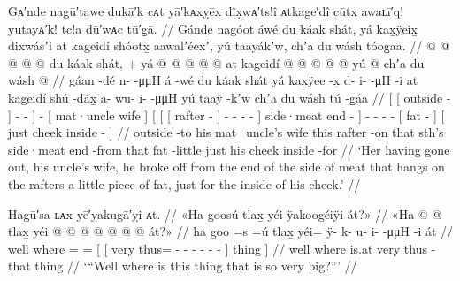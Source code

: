 \ex\label{ex:91-11-break-off-fatlet-for-cheek}%
%
\begingl
	\glpreamble	Gᴀ′nde nagū′tawe dukā′k cᴀt yā′kᴀxỵēx dîx̣wᴀ′ts!î ᴀtkage′dî cūtx
			awaʟī′q! yutayᴀ′k! tc!a dū′wᴀc tū′g̣ā. //
	\glpreamble	Gánde nagóot áwé du káak shát, yá kax̱ÿeix̱ dixwásʼi at kageidí shóotx̱
			aawalʼéexʼ, yú taayákʼw, chʼa du wásh tóog̱aa. //
	\gla	{} {}  @ {} {}  @ {} @ {} @ {} {}
		 @ {}
		{} du káak shát, {} +
		{} yá {} {}  @ {} {}
				 @ {} @ {} @ {} @ {} {}
			at kageidí  @ {} {}
		 @ {} @ {} @ {} @ {}
		{} yú  @ {} {}
		{} chʼa du wásh  @ {} {} //
	\glb	{} {} gáan -dé {} n-  -μμH {} {}
		á -wé
		{} du káak shát {}
		{} yá {} {} kax̱ÿee -x̱ {}
				d- i-  -μH -i {}
			at kageidí shú -dáx̱ {}
		a- wu- i-  -μμH
		{} yú taaÿ -kʼw {}
		{} chʼa du wásh tú -g̱áa {} //
	\glc	{}[ {}[ outside - {}]
			-  - \· {}]
		 -
		{}[  mat·uncle wife {}]
		{}[  {}[ {}[ rafter - {}]
				- -  - - {}]
			 side·meat end - {}]
		- - -  -
		{}[  fat - {}]
		{}[ just  cheek inside - {}] //
	\gld	{} {} outside -to {}  {} {} {} {}
		 {}
		{} his mat·uncle’s wife {}
		{} this {} {} rafter -on {}
			 {} {} {} \•that {}
			sth’s side·meat end -from {}
		 {} {} {} {}
		{} that fat -little {}
		{} just his cheek inside -for {} //
	\glft	‘Her having gone out, his uncle’s wife, he broke off from the end of
		the side of meat that hangs on the rafters a little piece of fat,
		just for the inside of his cheek.’
		//
\endgl
\xe

\ex\label{ex:91-12-where-is-this-big-thing}%
%
\begingl
	\glpreamble	Hagū′sa ʟᴀx yē′ỵakugā′ỵi ᴀt. //
	\glpreamble	«\!Ha goosú tlax̱ yéi ÿakoogéiÿi át?\!» //
	\gla	«\!Ha  @ {} @ {} {} {} tlax̱ yéi @  @ {} @ {} @ {} @ {} @ {} @ {} {} át?\!» {} //
	\glb	\pqp{}ha goo =s =ú {} {} tlax̱ yéi= ÿ- k- u- i-  -μμH -i {} át {} //
	\glc	\pqp{}well where = = {}[ {}[ very thus= - -
			- -  - - {}] thing {}] //
	\gld	\pqp{}well where \• \•is.at {} {} very thus
			 {} {} {} {} {} -that {} thing {} //
	\glft	‘“Well where is this thing that is so very big?”’
		//
\endgl
\xe

